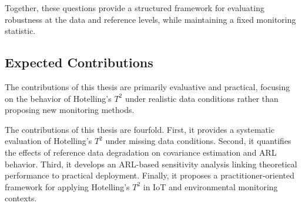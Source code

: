 Together, these questions provide a structured framework for evaluating robustness at the data and reference levels, while maintaining a fixed monitoring statistic.

\subsection{Expected Contributions}

The contributions of this thesis are primarily evaluative and practical, focusing on the behavior of Hotelling’s $T^2$ under realistic data conditions rather than proposing new monitoring methods.

The contributions of this thesis are fourfold. First, it provides a systematic evaluation of Hotelling’s $T^2$ under missing data conditions. Second, it quantifies the effects of reference data degradation on covariance estimation and \ac{ARL} behavior. Third, it develops an \ac{ARL}-based sensitivity analysis linking theoretical performance to practical deployment. Finally, it proposes a practitioner-oriented framework for applying Hotelling’s $T^2$ in \ac{IoT} and environmental monitoring contexts.


 